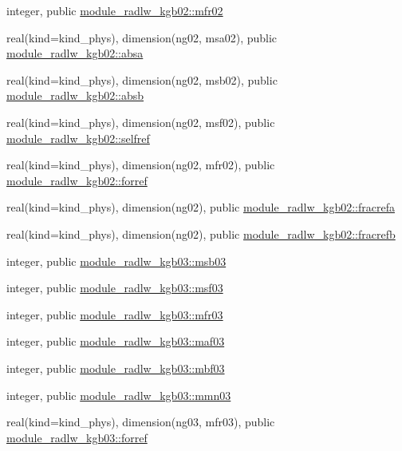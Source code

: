 \begin{DoxyCompactItemize}
integer, public \hyperlink{group__module__radlw__main_ga2973c2e9220e85b74f0b251c896aa837}{module\+\_\+radlw\+\_\+kgb02\+::mfr02}
\item 
real(kind=kind\+\_\+phys), dimension(ng02, msa02), public \hyperlink{group__module__radlw__main_ga46db893d4456b2d867130bb208cb2206}{module\+\_\+radlw\+\_\+kgb02\+::absa}
\item 
real(kind=kind\+\_\+phys), dimension(ng02, msb02), public \hyperlink{group__module__radlw__main_gacf34f9255586c9ed5ac5370db5b63c14}{module\+\_\+radlw\+\_\+kgb02\+::absb}
\item 
real(kind=kind\+\_\+phys), dimension(ng02, msf02), public \hyperlink{group__module__radlw__main_gaddb071e93b4ff49ba1f1c4d102e275f1}{module\+\_\+radlw\+\_\+kgb02\+::selfref}
\item 
real(kind=kind\+\_\+phys), dimension(ng02, mfr02), public \hyperlink{group__module__radlw__main_gaf6f3d7a0ab6858eab9d4d3e2d2d68031}{module\+\_\+radlw\+\_\+kgb02\+::forref}
\item 
real(kind=kind\+\_\+phys), dimension(ng02), public \hyperlink{group__module__radlw__main_gaf6db1580bd4a8b037cdd3e14765e2c83}{module\+\_\+radlw\+\_\+kgb02\+::fracrefa}
\item 
real(kind=kind\+\_\+phys), dimension(ng02), public \hyperlink{group__module__radlw__main_gaeedda30c8d2bd7c9e7124c6445c8c20e}{module\+\_\+radlw\+\_\+kgb02\+::fracrefb}
\item 
integer, public \hyperlink{group__module__radlw__main_gac57ba9584cbc3a5e4e2e0a6b548d21e9}{module\+\_\+radlw\+\_\+kgb03\+::msb03}
\item 
integer, public \hyperlink{group__module__radlw__main_gaf553bb46aa3ea6bcbb945cb2c2778955}{module\+\_\+radlw\+\_\+kgb03\+::msf03}
\item 
integer, public \hyperlink{group__module__radlw__main_ga4ea1e58a39585adc087718b92a16b529}{module\+\_\+radlw\+\_\+kgb03\+::mfr03}
\item 
integer, public \hyperlink{group__module__radlw__main_ga90d1081db011f0682cb4a83c40c5bb23}{module\+\_\+radlw\+\_\+kgb03\+::maf03}
\item 
integer, public \hyperlink{group__module__radlw__main_ga655fff8711d78d62ae9d4fa27d02621a}{module\+\_\+radlw\+\_\+kgb03\+::mbf03}
\item 
integer, public \hyperlink{group__module__radlw__main_gab4e84b10460930267256c0e5a1fe7a55}{module\+\_\+radlw\+\_\+kgb03\+::mmn03}
\item 
real(kind=kind\+\_\+phys), dimension(ng03, mfr03), public \hyperlink{group__module__radlw__main_gafcc55fa81ba6369b56d29db2342c2e6a}{module\+\_\+radlw\+\_\+kgb03\+::forref}

\end{DoxyCompactItemize}
